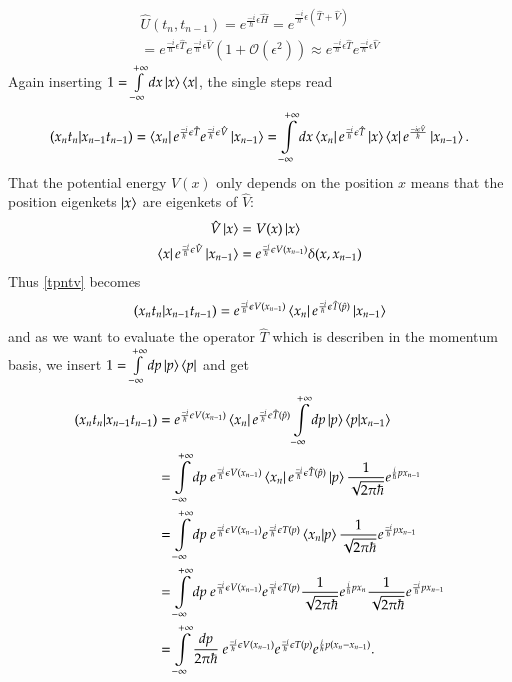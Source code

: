 \begin{align}\label{UTV}
  \hat{U}(t_{n},t_{n-1}) = e^{\frac{-i}{\hbar} \epsilon \hat{H}} = e^{\frac{-i}{\hbar} \epsilon (\hat T + \hat V)} \\
  = e^{\frac{-i}{\hbar} \epsilon \hat{T}} e^{\frac{-i}{\hbar} \epsilon \hat{V}} (1 + \mathcal{O} (\epsilon^2) ) \approx e^{\frac{-i}{\hbar} \epsilon \hat{T}} e^{\frac{-i}{\hbar} \epsilon \hat{V}} 
\end{align}
Again inserting $1 = \int\limits_{-\infty}^{+\infty} dx \ket{x}\bra{x}$, the single steps read
\begin{equation}\label{tpntv}
  (x_n t_n | x_{n-1} t_{n-1}) = \bra{x_n} e^{\frac{-i}{\hbar} \epsilon \hat{T}} e^{\frac{-i}{\hbar} \epsilon \hat{V}}  \ket{x_{n-1}} = \int\limits_{-\infty}^{+\infty} dx \bra{x_n} e^{\frac{-i}{\hbar} \epsilon \hat{T}} \ket{x} \bra{x} e^{\frac{-i \epsilon \hat{V}}{\hbar}}  \ket{x_{n-1}}.
\end{equation}
That the potential energy $V(x)$ only depends on the position $x$ means that the position eigenkets $\ket{x}$ are eigenkets of $\hat{V}$:
\begin{align}\label{Vx}
  \hat{V} \ket{x} &= V(x) \ket{x}  \\
  \bra{x} e^{\frac{-i}{\hbar} \epsilon \hat{V}}  \ket{x_{n-1}} &= e^{\frac{-i}{\hbar} \epsilon V(x_{n-1})} \delta (x,x_{n-1})
\end{align}
Thus \ref{tpntv} becomes
\begin{equation}\label{tpni}
   (x_n t_n | x_{n-1} t_{n-1}) = e^{\frac{-i}{\hbar} \epsilon V(x_{n-1})} \bra{x_n} e^{\frac{-i}{\hbar} \epsilon \hat{T}(\hat{p})} \ket{x_{n-1}}
\end{equation}
and as we want to evaluate the operator $\hat{T}$ which is describen in the momentum basis, we insert $1 = \int\limits_{-\infty}^{+\infty} dp \ket{p}\bra{p}$ and get
\begin{align}\label{tpnp}
   (x_n t_n | x_{n-1} t_{n-1})  &= e^{\frac{-i}{\hbar} \epsilon V(x_{n-1})} \bra{x_n} e^{\frac{-i}{\hbar} \epsilon \hat{T}(\hat{p})} \int\limits_{-\infty}^{+\infty} dp \ket{p}\braket{p|x_{n-1}} \\
                                &= \int\limits_{-\infty}^{+\infty} dp \ e^{\frac{-i}{\hbar} \epsilon V(x_{n-1})} \bra{x_n} e^{\frac{-i}{\hbar} \epsilon \hat{T}(\hat{p})} \ket{p} \frac{1}{\sqrt{2 \pi \hbar}} e^{\frac{i}{\hbar} p x_{n-1}} \\
                                &= \int\limits_{-\infty}^{+\infty} dp \ e^{\frac{-i}{\hbar} \epsilon V(x_{n-1})} e^{\frac{-i}{\hbar} \epsilon T(p)} \braket{x_n|p} \frac{1}{\sqrt{2 \pi \hbar}} e^{\frac{- i}{\hbar} p x_{n-1}} \\
                                &= \int\limits_{-\infty}^{+\infty} dp \ e^{\frac{-i}{\hbar} \epsilon V(x_{n-1})} e^{\frac{-i}{\hbar} \epsilon T(p)} \frac{1}{\sqrt{2 \pi \hbar}} e^{\frac{i}{\hbar} p x_{n}} \frac{1}{\sqrt{2 \pi \hbar}} e^{\frac{- i}{\hbar} p x_{n-1}}  \\
                                &= \int\limits_{-\infty}^{+\infty} \frac{dp}{2 \pi \hbar}  \ e^{\frac{-i}{\hbar} \epsilon V(x_{n-1})} e^{\frac{-i}{\hbar} \epsilon T(p)} e^{\frac{i}{\hbar} p (x_{n} -x_{n-1})}.
\end{align}
